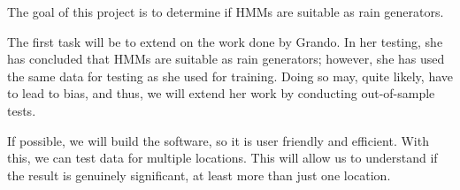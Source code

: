 The goal of this project is to determine if HMMs are suitable as rain generators.

The first task will be to extend on the work done by Grando. In her testing, she has concluded that HMMs are suitable as rain generators; however, she has used the same data for testing as she used for training.  Doing so may, quite likely, have to lead to bias, and thus, we will extend her work by conducting out-of-sample tests.

If possible, we will build the software, so it is user friendly and efficient. With this,  we can test data for multiple locations. This will allow us to understand if the result is genuinely significant, at least more than just one location.